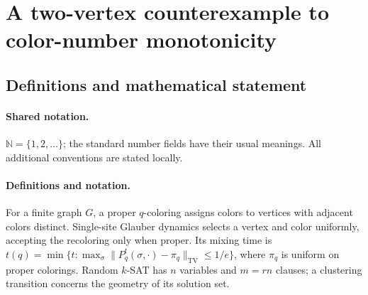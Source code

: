 \documentclass[11pt]{article}
\begin{document}
\section{A two-vertex counterexample to color-number monotonicity}\label{statement}

\subsection{Definitions and mathematical statement}

\paragraph{Shared notation.}$\mathbb N=\{1,2,\ldots\}$; the standard number fields have their usual meanings. All additional conventions are stated locally.


\paragraph{Definitions and notation.}For a finite graph $G$, a proper $q$-coloring assigns colors to vertices with adjacent colors distinct. Single-site Glauber dynamics selects a vertex and color uniformly, accepting the recoloring only when proper. Its mixing time is $t(q)=\min\{t:\max_\sigma\|P_q^t(\sigma,\cdot)-\pi_q\|_{\mathrm{TV}}\le1/e\}$, where $\pi_q$ is uniform on proper colorings. Random $k$-SAT has $n$ variables and $m=rn$ clauses; a clustering transition concerns the geometry of its solution set.
\end{document}
